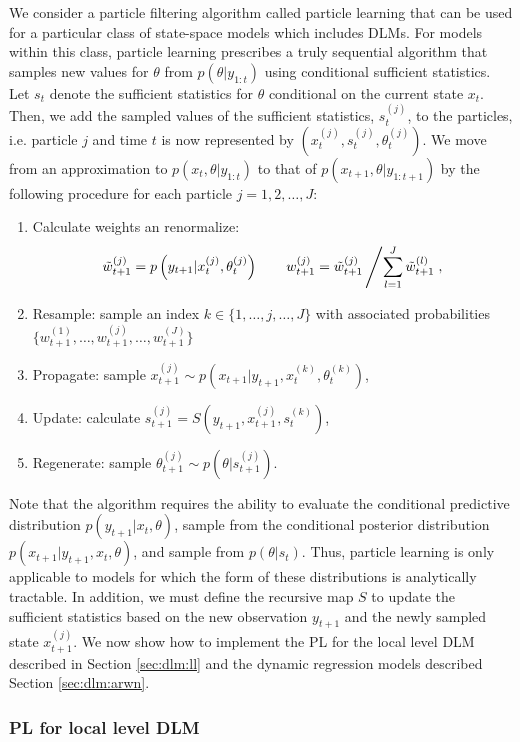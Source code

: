 We consider a particle filtering algorithm called particle learning \citep{Carv:Joha:Lope:Pols:part} that can be used for a particular class of state-space models which includes DLMs. For models within this class, particle learning prescribes a truly sequential algorithm that samples new values for $\theta$ from $p(\theta|y_{1:t})$ using conditional sufficient statistics. Let $s_t$ denote the sufficient statistics for $\theta$ conditional on the current state $x_t$. Then, we add the sampled values of the sufficient statistics, $s_t^{(j)}$, to the particles, i.e. particle $j$ and time $t$ is now represented by $\left(x_t^{(j)},s_t^{(j)},\theta_t^{(j)}\right)$. We move from an approximation to $p(x_t,\theta|y_{1:t})$ to that of $p(x_{t+1},\theta|y_{1:t+1})$ by the following procedure for each particle $j = 1,2,\ldots,J$:
\begin{enumerate}
\item Calculate weights an renormalize:
    \[\tilde{w}_{t+1}^{(j)} = p\left(y_{t+1}|x_t^{(j)},\theta_t^{(j)}\right) \qquad w_{t+1}^{(j)} = \tilde{w}_{t+1}^{(j)} \left/ \sum_{l=1}^J \tilde{w}_{t+1}^{(l)}\right.,\]
\item Resample: sample an index $k \in \{1,\ldots,j,\ldots,J\}$ with associated probabilities $\{w_{t+1}^{(1)},\ldots,w_{t+1}^{(j)},\ldots,w_{t+1}^{(J)}\}$
\item Propagate: sample $x_{t+1}^{(j)} \sim p\left(x_{t+1}|y_{t+1},x_t^{(k)},\theta_t^{(k)}\right)$,
\item Update: calculate $s_{t+1}^{(j)} = S\left(y_{t+1},x_{t+1}^{(j)},s_t^{(k)}\right)$,
\item Regenerate: sample $\theta_{t+1}^{(j)} \sim p\left(\theta|s_{t+1}^{(j)}\right)$.
\end{enumerate}
Note that the algorithm requires the ability to evaluate the conditional predictive distribution $p(y_{t+1}|x_t,\theta)$, sample from the conditional posterior distribution $p(x_{t+1}|y_{t+1},x_t,\theta)$, and sample from $p(\theta|s_t)$. Thus, particle learning is only applicable to models for which the form of these distributions is analytically tractable. In addition, we must define the recursive map $S$ to update the sufficient statistics based on the new observation $y_{t+1}$ and the newly sampled state $x_{t+1}^{(j)}$. We now show how to implement the PL for the local level DLM described in Section \ref{sec:dlm:ll} and the dynamic regression models described Section \ref{sec:dlm:arwn}.

\subsubsection{PL for local level DLM}

